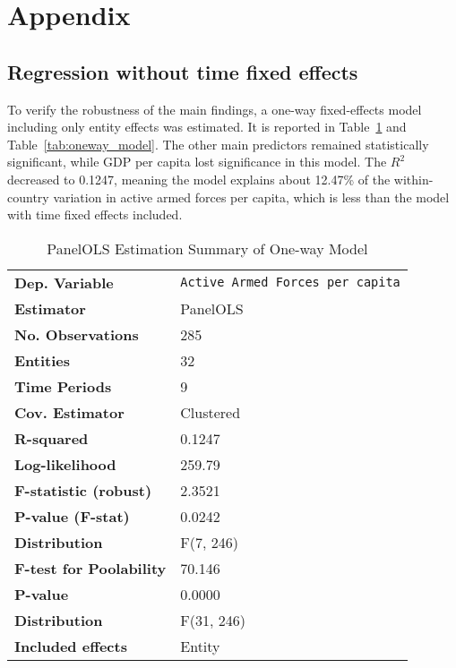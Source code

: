 \chapter*{Appendix}

\section*{Regression without time fixed effects}

To verify the robustness of the main findings, a one-way fixed-effects model including only entity effects was estimated. 
It is reported in Table~\ref{tab:oneway_summary} and Table~\ref{tab:oneway_model}. 
The other main predictors remained statistically significant, while GDP per capita lost significance in this model. 
The $R^2$ decreased to 0.1247, meaning the model explains about 12.47\% of the within-country variation in active armed forces per capita, which is less than the model with time fixed effects included.

\renewcommand{\arraystretch}{1.3}

\begin{table}[htbp]
\caption{PanelOLS Estimation Summary of One-way Model}
\centering
\begin{threeparttable}
\begin{tabularx}{\textwidth}{@{}lX@{}}
\toprule
\textbf{Dep. Variable} & \texttt{Active Armed Forces per capita} \\
\textbf{Estimator} & PanelOLS \\
\textbf{No. Observations} & 285 \\
\textbf{Entities} & 32 \\
\textbf{Time Periods} & 9 \\
\textbf{Cov. Estimator} & Clustered \\
\midrule
\textbf{R-squared} & 0.1247 \\
\textbf{Log-likelihood} & 259.79 \\
\textbf{F-statistic (robust)} & 2.3521 \\
\textbf{P-value (F-stat)} & 0.0242 \\
\textbf{Distribution} & F(7, 246) \\
\midrule
\textbf{F-test for Poolability} & 70.146 \\
\textbf{P-value} & 0.0000 \\
\textbf{Distribution} & F(31, 246) \\
\textbf{Included effects} & Entity \\
\bottomrule
\end{tabularx}
\end{threeparttable}
\label{tab:oneway_summary}
\end{table}

